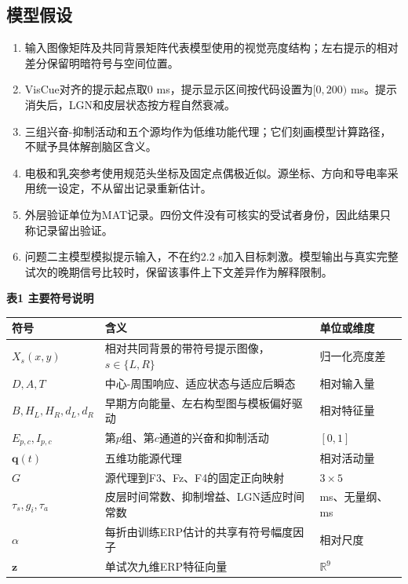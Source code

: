 \documentclass[12pt,a4paper]{article}
\providecommand{\tightlist}{\setlength{\itemsep}{0pt}\setlength{\parskip}{0pt}}
\begin{document}
\hypertarget{ux6a21ux578bux5047ux8bbe}{%
\subsection{模型假设}\label{ux6a21ux578bux5047ux8bbe}}

\begin{enumerate}
\def\labelenumi{\arabic{enumi}.}
\tightlist
\item
  输入图像矩阵及共同背景矩阵代表模型使用的视觉亮度结构；左右提示的相对差分保留明暗符号与空间位置。
\item
  VisCue对齐的提示起点取0 ms，提示显示区间按代码设置为\([0,200)\) ms。提示消失后，LGN和皮层状态按方程自然衰减。
\item
  三组兴奋-抑制活动和五个源均作为低维功能代理；它们刻画模型计算路径，不赋予具体解剖脑区含义。
\item
  电极和乳突参考使用规范头坐标及固定点偶极近似。源坐标、方向和导电率采用统一设定，不从留出记录重新估计。
\item
  外层验证单位为MAT记录。四份文件没有可核实的受试者身份，因此结果只称记录留出验证。
\item
  问题二主模型模拟提示输入，不在约2.2 s加入目标刺激。模型输出与真实完整试次的晚期信号比较时，保留该事件上下文差异作为解释限制。
\end{enumerate}

\newpage

\textbf{表1 主要符号说明}

\begin{longtable}[]{@{}lll@{}}
\toprule
符号 & 含义 & 单位或维度 \\
\midrule
\endhead
\(X_s(x,y)\) & 相对共同背景的带符号提示图像，\(s\in\{L,R\}\) & 归一化亮度差 \\
\(D,A,T\) & 中心-周围响应、适应状态与适应后瞬态 & 相对输入量 \\
\(B,H_L,H_R,d_L,d_R\) & 早期方向能量、左右构型图与模板偏好驱动 & 相对特征量 \\
\(E_{p,c},I_{p,c}\) & 第\(p\)组、第\(c\)通道的兴奋和抑制活动 & \([0,1]\) \\
\(\mathbf q(t)\) & 五维功能源代理 & 相对活动量 \\
\(G\) & 源代理到F3、Fz、F4的固定正向映射 & \(3\times5\) \\
\(\tau_s,g_i,\tau_a\) & 皮层时间常数、抑制增益、LGN适应时间常数 & ms、无量纲、ms \\
\(\alpha\) & 每折由训练ERP估计的共享有符号幅度因子 & 相对尺度 \\
\(\mathbf z\) & 单试次九维ERP特征向量 & \(\mathbb R^9\) \\
\bottomrule
\end{longtable}
\end{document}
